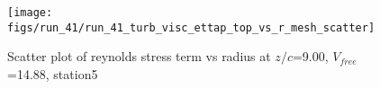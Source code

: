 \begin{figure}[H]
\centering
\texttt{[image: figs/run\_41/run\_41\_turb\_visc\_ettap\_top\_vs\_r\_mesh\_scatter]}
\caption{Scatter plot of reynolds stress term vs radius at $z/c$=9.00, $V_{free}$=14.88, station5}
\label{fig:run_41_turb_visc_ettap_top_vs_r_mesh_scatter}
\end{figure}


